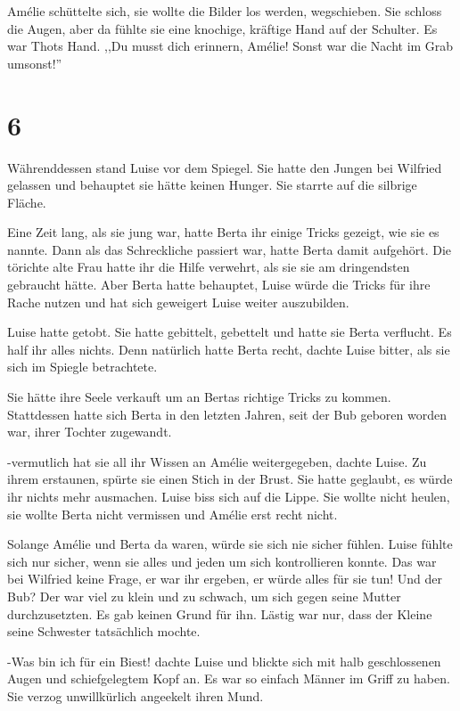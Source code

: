 \documentclass[11pt,titlepage,a5paper]{book}
\begin{document}
Amélie schüttelte sich, sie wollte die Bilder los werden, wegschieben. Sie schloss die Augen, aber da fühlte sie eine knochige, kräftige Hand auf der Schulter. Es war Thots Hand. ,,Du musst dich erinnern, Amélie! Sonst war die Nacht im Grab umsonst!''

\section*{6}

Währenddessen stand Luise vor dem Spiegel. Sie hatte den Jungen bei Wilfried gelassen und behauptet sie hätte keinen Hunger. Sie starrte auf die silbrige Fläche.

Eine Zeit lang, als sie jung war, hatte Berta ihr einige Tricks gezeigt, wie sie es nannte. Dann als das Schreckliche passiert war, hatte Berta damit aufgehört. Die törichte alte Frau hatte ihr die Hilfe verwehrt, als sie sie am dringendsten gebraucht hätte. Aber Berta hatte behauptet, Luise würde die Tricks für ihre Rache nutzen und hat sich geweigert Luise weiter auszubilden.

Luise hatte getobt. Sie hatte gebittelt, gebettelt und hatte sie Berta verflucht. Es half ihr alles nichts. Denn natürlich hatte Berta recht, dachte Luise bitter, als sie sich im Spiegle betrachtete.

Sie hätte ihre Seele verkauft um an Bertas richtige Tricks zu kommen. Stattdessen hatte sich Berta in den letzten Jahren, seit der Bub geboren worden war, ihrer Tochter zugewandt. 

-vermutlich hat sie all ihr Wissen an Amélie weitergegeben, dachte Luise. Zu ihrem erstaunen, spürte sie einen Stich in der Brust. Sie hatte geglaubt, es würde ihr nichts mehr ausmachen. Luise biss sich auf die Lippe. Sie wollte nicht heulen, sie wollte Berta nicht vermissen und Amélie erst recht nicht.

Solange Amélie und Berta da waren, würde sie sich nie sicher fühlen. Luise fühlte sich nur sicher, wenn sie alles und jeden um sich kontrollieren konnte. Das war bei Wilfried keine Frage, er war ihr ergeben, er würde alles für sie tun! Und der Bub? Der war viel zu klein und zu schwach, um sich gegen seine Mutter durchzusetzten. Es gab keinen Grund für ihn. Lästig war nur, dass der Kleine seine Schwester tatsächlich mochte.

-Was bin ich für ein Biest! dachte Luise und blickte sich mit halb geschlossenen Augen und schiefgelegtem Kopf an. Es war so einfach Männer im Griff zu haben. Sie verzog unwillkürlich angeekelt ihren Mund.
\end{document}
